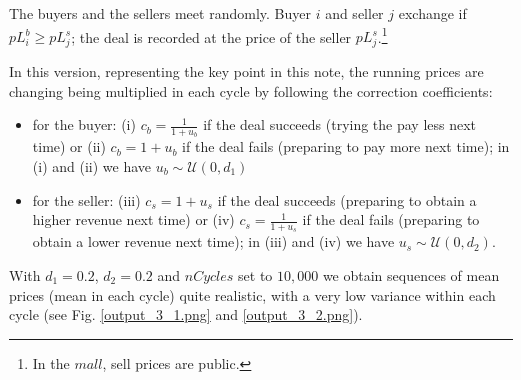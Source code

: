 \documentclass[12pt]{report}
\begin{document}
The buyers and the sellers meet randomly. Buyer $i$ and seller $j$ exchange if  $pL^b_i \geq pL^s_j$; the deal is recorded at the price of the seller $pL^s_j$.\footnote{In the $mall$, sell prices are public.}

In this version, representing the key point in this note, the running prices are changing being multiplied in each cycle by following the correction coefficients:

\begin{itemize}
\item for the buyer: (i) $c_b=\frac{1} {1 + u_b}$ if the deal succeeds (trying the pay less next time) or (ii) $c_b=1 + u_b$ if the deal fails (preparing to pay more next time); in (i) and (ii) we have $u_b\sim\mathcal{U}(0,d_1)$

\item for the seller: (iii) $c_s=1 + u_s$ if the deal succeeds (preparing to obtain a higher revenue next time) or (iv) $c_s=\frac{1} {1 + u_s}$  if the deal fails (preparing to obtain a lower revenue next time); in (iii) and (iv) we have $u_s\sim\mathcal{U}(0,d_2)$.
\end{itemize}

With $d_1=0.2$, $d_2=0.2$ and $nCycles$ set to $10,000$ we obtain sequences of mean prices (mean in each cycle) quite realistic, with a very low variance within each cycle (see Fig. \ref{output_3_1.png} and \ref{output_3_2.png}).
\end{document}
